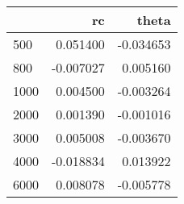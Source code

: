 \begin{tabular}{lrr}
\toprule
{} &        rc &     theta \\
\midrule
500  &  0.051400 & -0.034653 \\
800  & -0.007027 &  0.005160 \\
1000 &  0.004500 & -0.003264 \\
2000 &  0.001390 & -0.001016 \\
3000 &  0.005008 & -0.003670 \\
4000 & -0.018834 &  0.013922 \\
6000 &  0.008078 & -0.005778 \\
\bottomrule
\end{tabular}
